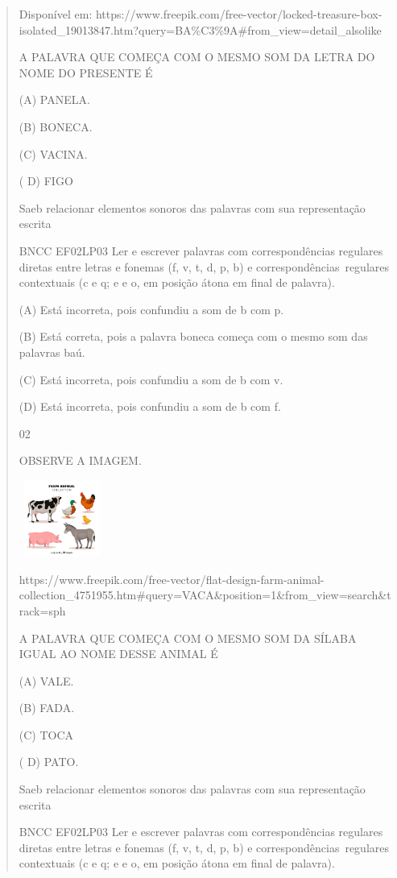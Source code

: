 \begin{verse}
{{{{{{{{{{{{{{{{Disponível em:
https://www.freepik.com/free-vector/locked-treasure-box-isolated\_19013847.htm?query=BA\%C3\%9A\#from\_view=detail\_alsolike

A PALAVRA QUE COMEÇA COM O MESMO SOM DA LETRA DO NOME DO PRESENTE É

(A) PANELA.

(B) BONECA.

(C) VACINA.

( D) FIGO

Saeb relacionar elementos sonoros das palavras com sua representação
escrita

BNCC EF02LP03 Ler e escrever palavras com correspondências regulares
diretas entre letras e fonemas (f, v, t, d, p, b) e
correspondências~regulares contextuais (c e q; e e o, em posição átona
em final de palavra).

(A) Está incorreta, \protect\hypertarget{_Hlk129267612}{}{}pois
confundiu a som de b com p.

(B) Está correta, pois a palavra boneca começa com o mesmo som das
palavras baú.

(C) Está incorreta, pois confundiu a som de b com v.

(D) Está incorreta, pois confundiu a som de b com f.

\num{02}

OBSERVE A IMAGEM.

\includegraphics[width=1.10000in,height=0.99236in]{media/image148.jpeg}

https://www.freepik.com/free-vector/flat-design-farm-animal-collection\_4751955.htm\#query=VACA\&position=1\&from\_view=search\&track=sph

\protect\hypertarget{_Hlk129501578}{}{}A PALAVRA QUE COMEÇA COM O MESMO
SOM DA SÍLABA IGUAL AO NOME DESSE ANIMAL É

(A) VALE.

(B) FADA.

(C) TOCA

( D) PATO.

Saeb relacionar elementos sonoros das palavras com sua representação
escrita

BNCC EF02LP03 Ler e escrever palavras com correspondências regulares
diretas entre letras e fonemas (f, v, t, d, p, b) e
correspondências~regulares contextuais (c e q; e e o, em posição átona
em final de palavra).

}}}}}}}}}}}}}}}}
\end{verse}
